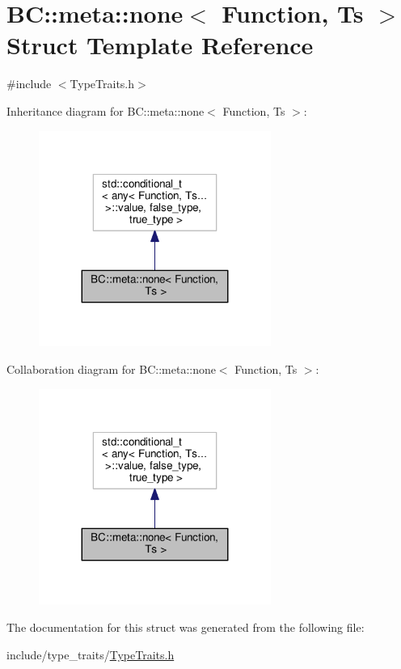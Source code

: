 \hypertarget{structBC_1_1meta_1_1none}{}\section{BC\+:\+:meta\+:\+:none$<$ Function, Ts $>$ Struct Template Reference}
\label{structBC_1_1meta_1_1none}


{\ttfamily \#include $<$Type\+Traits.\+h$>$}



Inheritance diagram for BC\+:\+:meta\+:\+:none$<$ Function, Ts $>$\+:
\nopagebreak
\begin{figure}[H]
\begin{center}
\leavevmode
\includegraphics[width=215pt]{structBC_1_1meta_1_1none__inherit__graph}
\end{center}
\end{figure}


Collaboration diagram for BC\+:\+:meta\+:\+:none$<$ Function, Ts $>$\+:
\nopagebreak
\begin{figure}[H]
\begin{center}
\leavevmode
\includegraphics[width=215pt]{structBC_1_1meta_1_1none__coll__graph}
\end{center}
\end{figure}


The documentation for this struct was generated from the following file\+:\begin{DoxyCompactItemize}
\item 
include/type\+\_\+traits/\hyperlink{TypeTraits_8h}{Type\+Traits.\+h}\end{DoxyCompactItemize}
